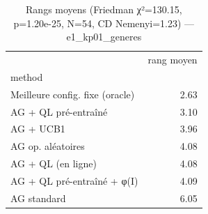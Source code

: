 \begin{table}
\caption{Rangs moyens (Friedman χ²=130.15, p=1.20e-25, N=54, CD Nemenyi=1.23) — e1_kp01_generes}
\label{tab:friedman_rangs}
\begin{tabular}{lr}
\toprule
 & rang moyen \\
method &  \\
\midrule
Meilleure config. fixe (oracle) & 2.63 \\
AG + QL pré-entraîné & 3.10 \\
AG + UCB1 & 3.96 \\
AG op. aléatoires & 4.08 \\
AG + QL (en ligne) & 4.08 \\
AG + QL pré-entraîné + φ(I) & 4.09 \\
AG standard & 6.05 \\
\bottomrule
\end{tabular}
\end{table}
